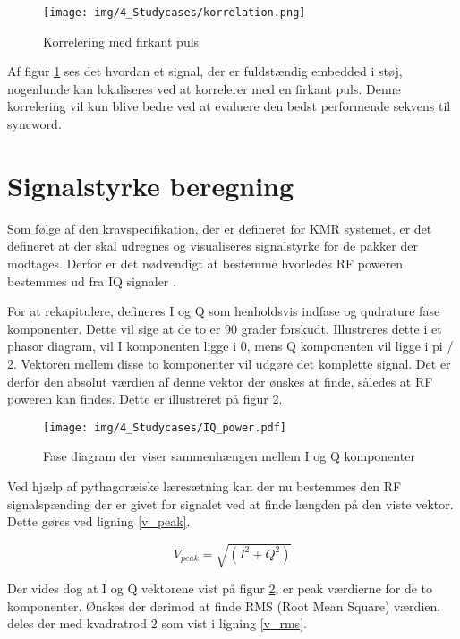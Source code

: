 \begin{appendices}
\begin{figure}[H]
	\centering{}
	\texttt{[image: img/4\_Studycases/korrelation.png]}
	\caption{Korrelering med firkant puls}
	\label{fig:correlation}
\end{figure} 

Af figur \ref{fig:correlation} ses det hvordan et signal, der er fuldstændig embedded i støj, nogenlunde kan lokaliseres ved at korrelerer med en firkant puls. Denne korrelering vil kun blive bedre ved at evaluere den bedst performende sekvens til syncword. 

\pagebreak
\section{Signalstyrke beregning} \label{appendix::studycase::signalstyrke}
Som følge af den kravspecifikation, der er defineret for KMR systemet, er det defineret at der skal udregnes og visualiseres signalstyrke for de pakker der modtages. Derfor er det nødvendigt at bestemme hvorledes RF poweren bestemmes ud fra IQ signaler \cite{iq-power}. 

For at rekapitulere, defineres I og Q som henholdsvis indfase og qudrature fase komponenter. Dette vil sige at de to er 90 grader forskudt. Illustreres dette i et phasor diagram, vil I komponenten ligge i 0, mens Q komponenten vil ligge i pi / 2. Vektoren mellem disse to komponenter vil udgøre det komplette signal. Det er derfor den absolut værdien af denne vektor der ønskes at finde, således at RF poweren kan findes. Dette er illustreret på figur \ref{fig:IQ_power}. 

\begin{figure}[H]
	\centering{}
	\texttt{[image: img/4\_Studycases/IQ\_power.pdf]}
	\caption{Fase diagram der viser sammenhængen mellem I og Q komponenter}
	\label{fig:IQ_power}
\end{figure} 

Ved hjælp af pythagoræiske læresætning kan der nu bestemmes den RF signalspænding der er givet for signalet ved at finde længden på den viste vektor. Dette gøres ved ligning \ref{v_peak}.

\begin{equation} \label{v_peak}
V_{peak} = \sqrt{(I^2 + Q^2)}
\end{equation}

Der vides dog at I og Q vektorene vist på figur \ref{fig:IQ_power}, er peak værdierne for de to komponenter. Ønskes der derimod at finde RMS (Root Mean Square) værdien, deles der med kvadratrod 2 som vist i ligning \ref{v_rms}.


\end{appendices}
